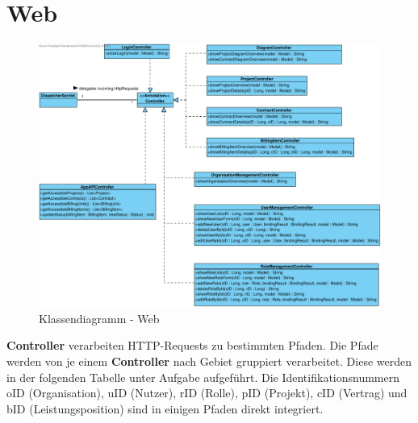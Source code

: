 \clearpage

\section{Web}

\begin{figure}[h]
	\centering
	\includegraphics[width=\linewidth]{img/diagrams/Frontend Classes.pdf}
	\caption{Klassendiagramm - Web}
	\label{fig:klassendiagramm-web}
\end{figure}

\noindent
\textbf{Controller} verarbeiten HTTP-Requests zu bestimmten Pfaden.
Die Pfade werden von je einem \textbf{Controller} nach Gebiet gruppiert verarbeitet.
Diese werden in der folgenden Tabelle unter Aufgabe aufgeführt.
Die Identifikationsnummern oID (Organisation), uID (Nutzer), rID (Rolle), pID (Projekt), cID (Vertrag) und bID (Leistungsposition) sind in einigen Pfaden direkt integriert.\\


